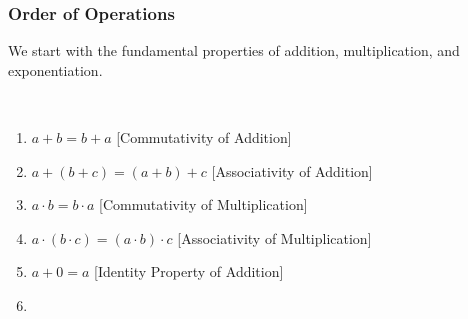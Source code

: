 \documentclass[crop=false,class=book,oneside]{standalone}                      %
\begin{document}
        \subsubsection{Order of Operations}
            We start with the fundamental properties of
            addition, multiplication, and exponentiation.
            \begin{properties}
                \label{property:North_Shore_Arithmetic_Properties}
                \
                \begin{enumerate}
                    \item
                        \label{%
                            property:%
                            North_Shore_Arithmetic_Properties_%
                            Com_Add%
                        }
                        $a+b=b+a$\hfill
                        [Commutativity of Addition]
                    \item
                        \label{
                            property:%
                            north_shore_arithmetic_properties_%
                            assoc_add%
                        }
                        $a+(b+c)=(a+b)+c$\hfill
                        [Associativity of Addition]
                    \item
                        \label{%
                            property:%
                            north_shore_arithmetic_properties_%
                            comm_mult%
                        }
                        ${a}\cdot{b}={b}\cdot{a}$\hfill
                        [Commutativity of Multiplication]
                    \item
                        \label{%
                            property:%
                            north_shore_arithmetic_properties_%
                            assoc_mult%
                        }
                        ${a}\cdot{({b}\cdot{c})}%
                         ={({a}\cdot{b})}\cdot{c}$\hfill
                        [Associativity of Multiplication]
                    \item
                        \label{%
                            property:%
                            north_shore_arithmetic_properties_%
                            add_identity
                        }
                        $a+0=a$\hfill%
                        [Identity Property of Addition]
                    \item
                        \label{%
                            property:%
}
\end{enumerate}
\end{properties}
\end{document}
